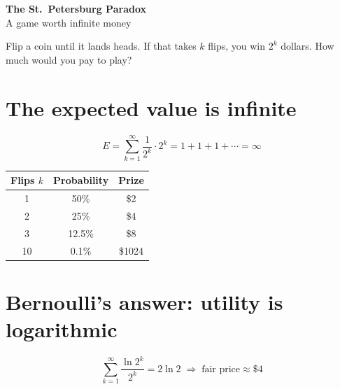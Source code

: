 \documentclass[11pt]{article}
\begin{document}
\begin{center}
  {\LARGE\bfseries The St.\ Petersburg Paradox}\\[4pt]
  {\large A game worth infinite money}
\end{center}

Flip a coin until it lands heads. If that takes \(k\) flips,
you win \(2^k\) dollars. How much would you pay to play?

\section*{The expected value is infinite}
\[
  E = \sum_{k=1}^{\infty} \frac{1}{2^k} \cdot 2^k
    = 1 + 1 + 1 + \cdots = \infty
\]

\begin{center}
\begin{tabular}{ccc}
  \hline
  Flips \(k\) & Probability & Prize \\
  \hline
  1 & 50\% & \$2 \\
  2 & 25\% & \$4 \\
  3 & 12.5\% & \$8 \\
  10 & 0.1\% & \$1024 \\
  \hline
\end{tabular}
\end{center}

\begin{center}
\end{center}

\section*{Bernoulli's answer: utility is logarithmic}
\[
  \sum_{k=1}^{\infty} \frac{\ln 2^k}{2^k} = 2 \ln 2
  \;\Rightarrow\; \text{fair price} \approx \$4
\]
\end{document}
